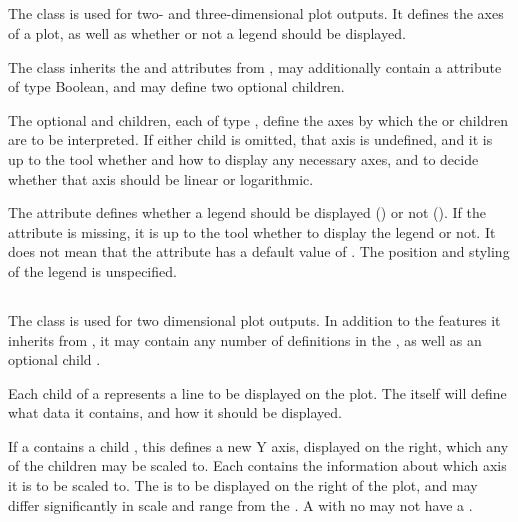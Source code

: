 \begin{blockChanged}
\subsection{}
\label{class:plot}
The \Plot class is used for two- and three-dimensional plot outputs.  It defines the axes of a plot, as well as whether or not a legend should be displayed.


\begin{blockChanged}
The \Plot class inherits the  and  attributes from \SedBase, may additionally contain a  attribute of type Boolean, and may define two optional \Axis children.

The optional  and  children, each of type \Axis, define the axes by which the \Curve or \Surface children are to be interpreted.  If either child is omitted, that axis is undefined, and it is up to the tool whether and how to display any necessary axes, and to decide whether that axis should be linear or logarithmic.

The  attribute defines whether a legend should be displayed () or not ().  If the attribute is missing, it is up to the tool whether to display the legend or not.  It does not mean that the attribute has a default value of .  The position and styling of the legend is unspecified.
\subsection{}
\label{class:plot2D}
\label{class:listOfCurves}
The \PlotTwo class is used for two dimensional plot outputs. In addition to the features it inherits from \Plot, it may contain any number of \Curve definitions in the , as well as an optional child .

Each child \Curve of a \PlotTwo represents a line to be displayed on the plot.  The \Curve itself will define what data it contains, and how it should be displayed.

If a \PlotTwo contains a child , this defines a new Y axis, displayed on the right, which any of the \Curve children may be scaled to.  Each \Curve contains the information about which axis it is to be scaled to.  The  is to be displayed on the right of the plot, and may differ significantly in scale and range from the .  A \PlotTwo with no  may not have a .



\end{blockChanged}
\end{blockChanged}
